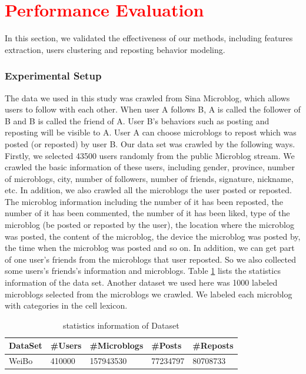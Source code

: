 \section{\textcolor{red}{Performance Evaluation}}
\label{sec:perf}


In this section, we validated the effectiveness of our methods, including features extraction, users clustering and reposting behavior modeling.

\subsubsection{Experimental Setup}

The data we used in this study was crawled from Sina Microblog, which allows users to follow with each other. When user A follows B, A is called the follower of B and B is called the friend of A. User B's behaviors such as posting and reposting will be visible to A. User A can choose microblogs to repost which was posted (or reposted) by user B. Our data set was crawled by the following ways. Firstly, we selected 43500 users randomly from the public Microblog stream. We crawled the basic information of these users, including gender, province, number of microblogs, city, number of followers, number of friends, signature, nickname, etc. In addition, we also crawled all the microblogs the user posted or reposted. The microblog information including the number of it has been reposted, the number of it has been commented, the number of it has been liked, type of the microblog (be posted or reposted by the user), the location where the microblog was posted, the content of the microblog, the device the microblog was posted by, the time when the microblog was posted and so on. In addition, we can get part of one user's friends from the microblogs that user reposted. So we also collected some users's friends's information and microblogs. Table \ref{tab:Data_statistics} lists the statistics information of the data set. Another dataset we used here was 1000 labeled microblogs selected from the microblogs we crawled. We labeled each microblog with categories in the cell lexicon.\par

\begin{table}[!h]
\centering
    \caption{statistics information of Dataset }     %
    \label{tab:Data_statistics}
    \begin{small}
    \begin{tabular}{|l|l|l|l|l|}
    \hline
    \cline{2-5}
    {\bfseries DataSet} & {\bfseries  \#Users}         & {\bfseries \#Microblogs}     & {\bfseries \#Posts}    & {\bfseries \#Reposts}     \\
    \hline
    WeiBo         & 410000 & 157943530		& 77234797 & 80708733	\\
    \hline
    \end{tabular}
    \end{small}
\end{table}

